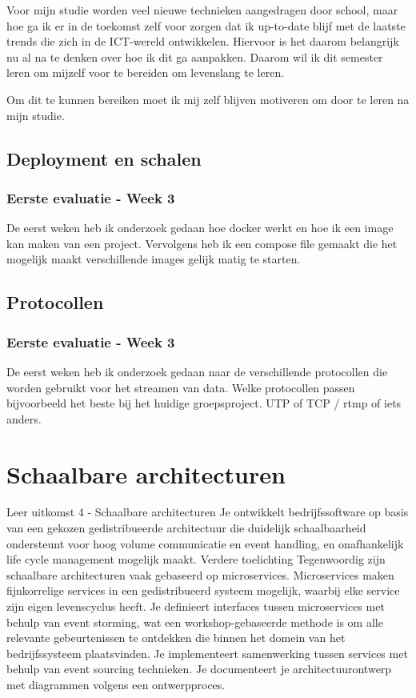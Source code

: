 Voor mijn studie worden veel nieuwe technieken aangedragen door school, maar hoe ga ik er in de toekomst zelf voor
zorgen dat ik up-to-date blijf met de laatste trends die zich in de ICT-wereld ontwikkelen.
Hiervoor is het daarom belangrijk nu al na te denken over hoe ik dit ga aanpakken.
Daarom wil ik dit semester leren om mijzelf voor te bereiden om levenslang te leren.

Om dit te kunnen bereiken moet ik mij zelf blijven motiveren om door te leren na mijn studie.



\subsection{Deployment en schalen}\label{subsec:deployen-en-schalen}

	\subsubsection{Eerste evaluatie - Week 3}\label{subsubsec:eerste-evaluatie---week-3}
	De eerst weken heb ik onderzoek gedaan hoe docker werkt en hoe ik een image kan maken van een project.
	Vervolgens heb ik een compose file gemaakt die het mogelijk maakt verschillende images gelijk matig te starten.

   \subsection{Protocollen}\label{subsec:protocollen}
	\subsubsection{Eerste evaluatie - Week 3}
	De eerst weken heb ik onderzoek gedaan naar de verschillende protocollen die worden gebruikt voor het streamen
	van data.
	Welke protocollen passen bijvoorbeeld het beste bij het huidige groepsproject.
	UTP of TCP / rtmp of iets anders.


\section{Schaalbare architecturen}\label{sec:schaalbare-architecturen}
Leer uitkomst 4 - Schaalbare architecturen Je ontwikkelt bedrijfssoftware op basis van een gekozen gedistribueerde
architectuur die duidelijk schaalbaarheid ondersteunt voor hoog volume communicatie en event handling, en onafhankelijk life cycle management mogelijk maakt.
Verdere toelichting Tegenwoordig zijn schaalbare architecturen vaak gebaseerd op microservices.
Microservices maken fijnkorrelige services in een gedistribueerd systeem mogelijk, waarbij elke service zijn eigen levenscyclus heeft.
Je definieert interfaces tussen microservices met behulp van event storming, wat een workshop-gebaseerde methode is om alle relevante gebeurtenissen te ontdekken die binnen het domein van het bedrijfssysteem plaatsvinden.
Je implementeert samenwerking tussen services met behulp van event sourcing technieken.
Je documenteert je architectuurontwerp met diagrammen volgens een ontwerpproces.






